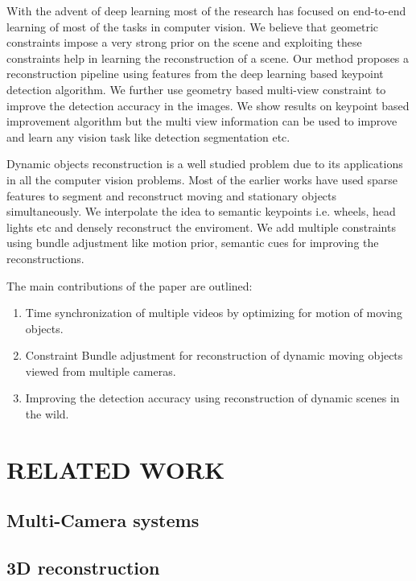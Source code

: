 \documentclass[10pt,twocolumn,letterpaper]{article}
\begin{document}
With the advent of deep learning most of the research has focused on end-to-end learning of most of the tasks in computer vision. We believe that geometric constraints impose a very strong prior on the scene and exploiting these constraints help in learning the reconstruction of a scene. Our method proposes a reconstruction pipeline using features from the deep learning based keypoint detection algorithm. We further use geometry based multi-view constraint to improve the detection accuracy in the images. We show results on keypoint based improvement algorithm but the multi view information can be used to improve and learn any vision task like detection segmentation etc.

Dynamic objects reconstruction is a well studied problem due to its applications in all the computer vision problems. Most of the earlier works have used sparse features to segment and reconstruct moving and stationary objects simultaneously. We interpolate the idea to semantic keypoints i.e. wheels, head lights etc and densely reconstruct the enviroment. We add multiple constraints using bundle adjustment like motion prior, semantic cues for improving the reconstructions.

The main contributions of the paper are outlined:
\begin{enumerate}
\item  Time synchronization of multiple videos by optimizing for motion of moving objects. 
\item Constraint Bundle adjustment for reconstruction of dynamic moving objects viewed from multiple cameras. 
\item Improving the detection accuracy using reconstruction of dynamic scenes in the wild.
\end{enumerate}

\section{RELATED WORK}
\subsection{Multi-Camera systems}
\subsection{3D reconstruction}
\end{document}
